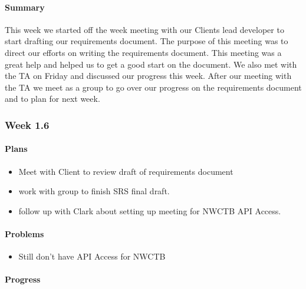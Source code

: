 \documentclass[onecolumn, draftclsnofoot,10pt, compsoc]{article}
\begin{document}
		    \paragraph{Summary}
		        
		        This week we started off the week meeting with our Clients lead developer to start drafting our requirements document. The purpose of this meeting was to direct our efforts on writing the requirements document. This meeting was a great help and helped us to get a good start on the document.  We also met with the TA on Friday and discussed our progress this week. After our meeting with the TA we meet as a group to go over our progress on the requirements document and to plan for next week.\\
		
		\subsubsection{Week 1.6}
		
		    \paragraph{Plans} \hfill \break
		        
		        \begin{itemize}
		            \item Meet with Client to review draft of requirements document
		            \item work with group to finish SRS final draft.
		            \item follow up with Clark about setting up meeting for NWCTB API Access.
		        \end{itemize}
		
		    \paragraph{Problems} \hfill \break
		        
		        \begin{itemize}
		            \item Still don't have API Access for NWCTB
		        \end{itemize}
		        
		    \paragraph{Progress} \hfill \break
		    
\end{document}
